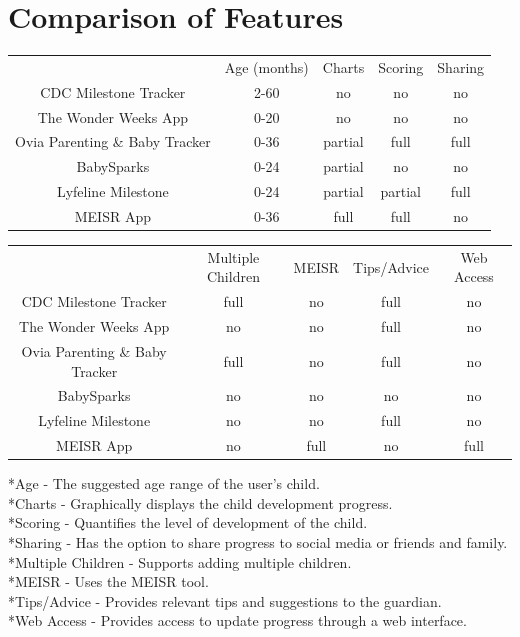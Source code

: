 \section{Comparison of Features}
\begin{center}
\begin{tabular}{ c c c c c}
  & Age (months) & Charts & Scoring & Sharing \\
 CDC Milestone Tracker & 2-60 & no & no & no\\
 The Wonder Weeks App & 0-20 & no & no & no\\
 Ovia Parenting \& Baby Tracker & 0-36 & partial & full & full\\
 BabySparks & 0-24 & partial & no & no\\
 Lyfeline Milestone & 0-24 & partial & partial & full\\
 MEISR App & 0-36 & full & full & no\\
\end{tabular}
\newline
\vspace*{.25 cm}
\newline
\begin{tabular}{ c c c c c}
  & Multiple Children & MEISR & Tips/Advice & Web Access\\
 CDC Milestone Tracker & full & no & full & no\\
 The Wonder Weeks App & no & no & full & no\\
 Ovia Parenting \& Baby Tracker & full & no & full & no\\
 BabySparks & no & no & no & no\\
 Lyfeline Milestone & no & no & full & no\\
 MEISR App & no & full & no & full\\
\end{tabular}
\end{center}

*Age - The suggested age range of the user’s child.\\
*Charts - Graphically displays the child development progress.\\
*Scoring - Quantifies the level of development of the child.\\
*Sharing - Has the option to share progress to social media or friends and family.\\
*Multiple Children - Supports adding multiple children.\\
*MEISR - Uses the MEISR tool.\\
*Tips/Advice - Provides relevant tips and suggestions to the guardian.\\
*Web Access - Provides access to update progress through a web interface.
\pagebreak
